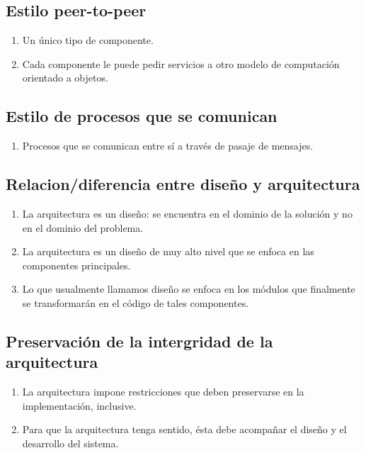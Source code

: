   \subsection{Estilo peer-to-peer}

    \begin{enumerate}[-]
      \item Un único tipo de componente.
      \item Cada componente le puede pedir servicios a otro modelo de computación orientado a objetos.
    \end{enumerate}

  \subsection{Estilo de procesos que se comunican}

    \begin{enumerate}[-]
      \item Procesos que se comunican entre sí a través de pasaje de mensajes.
    \end{enumerate}

  \subsection{Relacion/diferencia entre diseño y arquitectura}

    \begin{enumerate}[-]
      \item La arquitectura es un diseño: se encuentra en el dominio de la solución y no en el dominio del problema.
      \item La arquitectura es un diseño de muy alto nivel que se enfoca en las componentes principales.
      \item Lo que usualmente llamamos diseño se enfoca en los módulos que finalmente se transformarán en el código de
            tales componentes.
    \end{enumerate}

  \subsection{Preservación de la intergridad de la arquitectura}

    \begin{enumerate}[-]
      \item La arquitectura impone restricciones que deben preservarse en la implementación, inclusive.
      \item Para que la arquitectura tenga sentido, ésta debe acompañar el diseño y el desarrollo del sistema.
    \end{enumerate}

